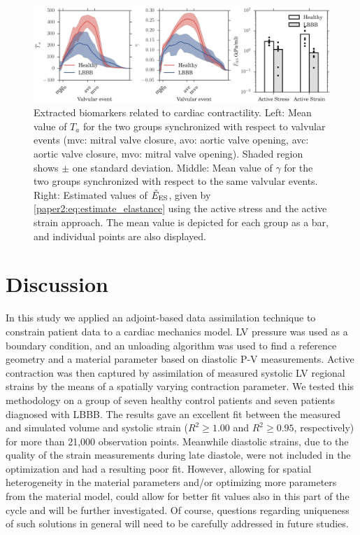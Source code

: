 \begin{figure}[htbp]
  \centering
  \includegraphics[width=\textwidth]{contractility}
  \caption{Extracted biomarkers related to cardiac contractility.
    Left:  Mean value of $T_a$ for the two groups
    synchronized with respect to valvular events (mvc: mitral valve
    closure, avo: aortic valve opening, avc: aortic valve closure,
    mvo: mitral valve opening). Shaded region shows $\pm$ one standard
    deviation.
    Middle:  Mean value of $\gamma$ for the two groups
    synchronized with respect to the same valvular events.
    Right: Estimated values of $\tilde{E}_{\text{ES}}$, given by
    \eqref{paper2:eq:estimate_elastance} using the active stress and the
    active strain approach. The mean value is depicted for each
    group as a bar, and individual points are also displayed.} 
  \label{paper2:fig:contractility}
\end{figure}



\section{Discussion}
In this study we applied an adjoint-based data assimilation technique
to constrain patient data to a cardiac mechanics model.
LV pressure was used as a boundary condition,  and an unloading algorithm was used to 
find a reference geometry and a material parameter based on diastolic P-V measurements.  
Active contraction was then captured by assimilation of measured systolic LV
regional strains by the means of a
spatially varying contraction parameter.  We tested this methodology on a group of
seven healthy control patients and seven patients
diagnosed with LBBB. The results gave an excellent fit between the measured
and simulated volume and systolic strain ($R^2 \geq 1.00$ and $R^2
\geq 0.95$, respectively) for more than 21,000 observation points.
Meanwhile diastolic strains, due to the quality of the strain measurements during late
diastole, were not included in the optimization and had a
resulting poor fit.  However, allowing for spatial heterogeneity in the 
material parameters and/or optimizing more parameters from the
material model, could allow for better fit values also in this
part of the cycle and will be further investigated. Of course, questions regarding uniqueness of
such solutions in general will need to be carefully
addressed in future studies. 

